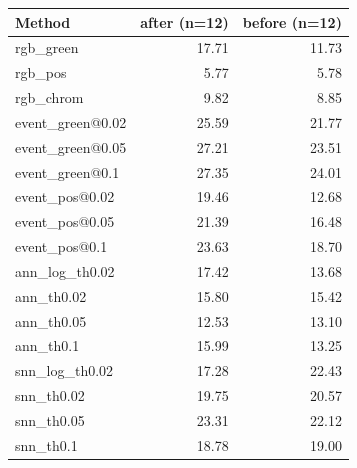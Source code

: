 \begin{tabular}{lrr}\toprule
Method & after (n=12) & before (n=12) \\\midrule
rgb\_green & 17.71 & 11.73 \\
rgb\_pos & 5.77 & 5.78 \\
rgb\_chrom & 9.82 & 8.85 \\
event\_green@0.02 & 25.59 & 21.77 \\
event\_green@0.05 & 27.21 & 23.51 \\
event\_green@0.1 & 27.35 & 24.01 \\
event\_pos@0.02 & 19.46 & 12.68 \\
event\_pos@0.05 & 21.39 & 16.48 \\
event\_pos@0.1 & 23.63 & 18.70 \\
ann\_log\_th0.02 & 17.42 & 13.68 \\
ann\_th0.02 & 15.80 & 15.42 \\
ann\_th0.05 & 12.53 & 13.10 \\
ann\_th0.1 & 15.99 & 13.25 \\
snn\_log\_th0.02 & 17.28 & 22.43 \\
snn\_th0.02 & 19.75 & 20.57 \\
snn\_th0.05 & 23.31 & 22.12 \\
snn\_th0.1 & 18.78 & 19.00 \\
\bottomrule\end{tabular}

